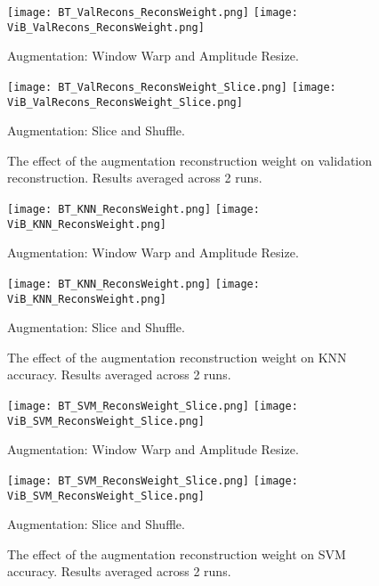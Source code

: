 \documentclass[../../thesis.tex]{subfiles}
\begin{document}
\begin{figure}[H]
    \centering
    \begin{minipage}[b]{\textwidth}
        \centering
        \texttt{[image: BT\_ValRecons\_ReconsWeight.png]}
        \texttt{[image: ViB\_ValRecons\_ReconsWeight.png]}
    \end{minipage}
    \caption*{Augmentation: Window Warp and Amplitude Resize.}
    \begin{minipage}[b]{\textwidth}
        \centering
        \texttt{[image: BT\_ValRecons\_ReconsWeight\_Slice.png]}
        \texttt{[image: ViB\_ValRecons\_ReconsWeight\_Slice.png]}
    \end{minipage}
    \caption*{Augmentation: Slice and Shuffle.}
    \caption{The effect of the augmentation reconstruction weight on validation reconstruction. Results averaged across 2 runs.}
    \label{fig:aug_recons_val_recons}
\end{figure}


\begin{figure}[H]
    \centering
    \begin{minipage}[b]{\textwidth}
        \centering
        \texttt{[image: BT\_KNN\_ReconsWeight.png]}
        \texttt{[image: ViB\_KNN\_ReconsWeight.png]}
    \end{minipage}
    \caption*{Augmentation: Window Warp and Amplitude Resize.}
    \begin{minipage}[b]{\textwidth}
        \centering
        \texttt{[image: BT\_KNN\_ReconsWeight.png]}
        \texttt{[image: ViB\_KNN\_ReconsWeight.png]}
    \end{minipage}
    \caption*{Augmentation: Slice and Shuffle.}
    \caption{The effect of the augmentation reconstruction weight on KNN accuracy. Results averaged across 2 runs.}
    \label{fig:aug_recons_KNN}
\end{figure}


\begin{figure}[H]
    \centering
    \begin{minipage}[b]{\textwidth}
        \centering
        \texttt{[image: BT\_SVM\_ReconsWeight\_Slice.png]}
        \texttt{[image: ViB\_SVM\_ReconsWeight\_Slice.png]}
    \end{minipage}
    \caption*{Augmentation: Window Warp and Amplitude Resize.}
    \begin{minipage}[b]{\textwidth}
        \centering
        \texttt{[image: BT\_SVM\_ReconsWeight\_Slice.png]}
        \texttt{[image: ViB\_SVM\_ReconsWeight\_Slice.png]}
    \end{minipage}
    \caption*{Augmentation: Slice and Shuffle.}
    \caption{The effect of the augmentation reconstruction weight on SVM accuracy. Results averaged across 2 runs.}
    \label{fig:aug_recons_SVM}

\end{figure}
\end{document}
